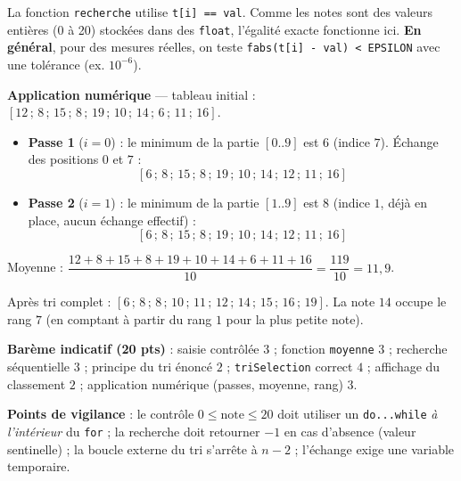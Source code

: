 \documentclass[11pt]{article}
\begin{document}
\begin{corrige}
\begin{attention}
La fonction \texttt{recherche} utilise \texttt{t[i] == val}. Comme les notes sont des valeurs entières (0 à 20) stockées dans des \texttt{float}, l'égalité exacte fonctionne ici. \textbf{En général}, pour des mesures réelles, on teste \texttt{fabs(t[i] - val) < EPSILON} avec une tolérance (ex. $10^{-6}$).
\end{attention}

\textbf{Application numérique} — tableau initial : $[12\,;\,8\,;\,15\,;\,8\,;\,19\,;\,10\,;\,14\,;\,6\,;\,11\,;\,16]$.
\begin{itemize}
\item \textbf{Passe 1} ($i = 0$) : le minimum de la partie $[0..9]$ est $6$ (indice $7$). Échange des positions $0$ et $7$ :
\[ [6\,;\,8\,;\,15\,;\,8\,;\,19\,;\,10\,;\,14\,;\,12\,;\,11\,;\,16] \]
\item \textbf{Passe 2} ($i = 1$) : le minimum de la partie $[1..9]$ est $8$ (indice $1$, déjà en place, aucun échange effectif) :
\[ [6\,;\,8\,;\,15\,;\,8\,;\,19\,;\,10\,;\,14\,;\,12\,;\,11\,;\,16] \]
\end{itemize}
Moyenne : $\dfrac{12+8+15+8+19+10+14+6+11+16}{10} = \dfrac{119}{10} = 11,9$.

Après tri complet : $[6\,;\,8\,;\,8\,;\,10\,;\,11\,;\,12\,;\,14\,;\,15\,;\,16\,;\,19]$. La note $14$ occupe le rang $7$ (en comptant à partir du rang $1$ pour la plus petite note).

\textbf{Barème indicatif (20 pts)} : saisie contrôlée $3$ ; fonction \texttt{moyenne} $3$ ; recherche séquentielle $3$ ; principe du tri énoncé $2$ ; \texttt{triSelection} correct $4$ ; affichage du classement $2$ ; application numérique (passes, moyenne, rang) $3$.

\textbf{Points de vigilance} : le contrôle $0 \leq \text{note} \leq 20$ doit utiliser un \texttt{do...while} \emph{à l'intérieur} du \texttt{for} ; la recherche doit retourner $-1$ en cas d'absence (valeur sentinelle) ; la boucle externe du tri s'arrête à $n-2$ ; l'échange exige une variable temporaire.
\end{corrige}
\end{document}
